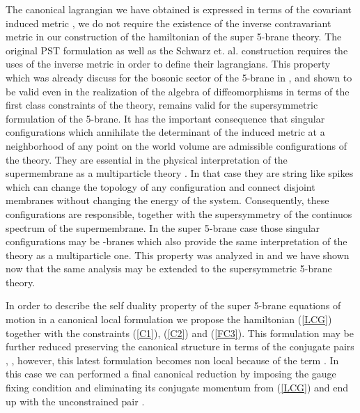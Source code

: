 \documentclass[a4paper,12pt]{article}
\def\a{\underline{a}}
\begin{document}
The canonical lagrangian we have obtained is expressed in terms of
the covariant induced metric \coordHE{}, we do not require the
existence of the inverse contravariant metric in our construction
of the hamiltonian of the super 5-brane theory. The original PST
formulation as well as the Schwarz et. al. construction requires
the uses of the inverse metric \coordHE{} in order to define
their lagrangians. This property which was already discuss for the
bosonic sector of the 5-brane in \cite{DeCastro:2001gp}, and shown
to be valid even in the realization of the algebra of
diffeomorphisms  in terms of the first class constraints of the
theory, remains valid for the supersymmetric formulation of the
5-brane. It has the important consequence that singular
configurations which annihilate the determinant of the induced
metric at a neighborhood of any point on the world volume are
admissible configurations of the theory. They are essential in the
physical interpretation of the supermembrane as a multiparticle
theory \cite{deWit:1988ig} \cite{Nicolai:1998ic}. In that case
they are string like spikes which can change the topology of any
configuration and connect  disjoint membranes without changing the
energy of the system. Consequently, these configurations are
responsible, together with the supersymmetry of the continuos
spectrum of the supermembrane. In the super 5-brane case those
singular configurations  may be \coordHE{}-branes which
also provide the same interpretation of the theory as a
multiparticle one. This property was analyzed in
\cite{DeCastro:2001gp} and we have shown now that the same
analysis may be extended to the supersymmetric 5-brane theory.


In order to describe the self duality property of the super
5-brane equations of motion in a canonical local formulation we
propose the hamiltonian (\ref{LCG}) together with the constraints
(\ref{C1}), (\ref{C2}) and (\ref{FC3}). This formulation may be
further reduced preserving the canonical structure in terms of the
conjugate pairs \coordHE{}, \coordHE{}, however, this
latest formulation becomes non local because of the term
\coordHE{}. In this
case we can performed a final canonical reduction by imposing the
gauge fixing condition  \coordHE{} and eliminating its conjugate
momentum \coordHE{} from (\ref{LCG}) and end up with the unconstrained
pair \myHighlight{$(A_{\a}, \partial_4P^{\a})$}\coordHE{}.
\end{document}
